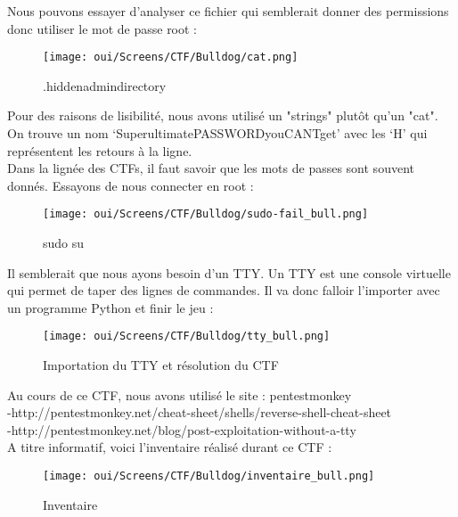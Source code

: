 Nous pouvons essayer d’analyser ce fichier qui semblerait donner des permissions donc utiliser le mot de passe root :

\begin{figure}[htp!]
  \centering
  \setlength\figureheight{7cm}
  \setlength\figurewidth{9cm}
  \texttt{[image: oui/Screens/CTF/Bulldog/cat.png]}
  \caption{.hiddenadmindirectory}
  \label{fig:courbe-tikz}
\end{figure}

Pour des raisons de lisibilité, nous avons utilisé un "strings" plutôt qu’un "cat". On trouve un nom ‘SuperultimatePASSWORDyouCANTget’ avec les ‘H’ qui représentent les retours à la ligne.\\
Dans la lignée des CTFs, il faut savoir que les mots de passes sont souvent donnés. Essayons de nous connecter en root :

\begin{figure}[htp!]
  \centering
  \setlength\figureheight{7cm}
  \setlength\figurewidth{9cm}
  \texttt{[image: oui/Screens/CTF/Bulldog/sudo-fail\_bull.png]}
  \caption{sudo su}
  \label{fig:courbe-tikz}
\end{figure}

Il semblerait que nous ayons besoin d’un TTY. Un TTY est une console virtuelle qui permet de taper des lignes de commandes. Il va donc falloir l’importer avec un programme Python et finir le jeu :

\begin{figure}[htp!]
  \centering
  \setlength\figureheight{7cm}
  \setlength\figurewidth{9cm}
  \texttt{[image: oui/Screens/CTF/Bulldog/tty\_bull.png]}
  \caption{Importation du TTY et résolution du CTF}
  \label{fig:courbe-tikz}
\end{figure}

\newpage
Au cours de ce CTF, nous avons utilisé le site : pentestmonkey\\
-http://pentestmonkey.net/cheat-sheet/shells/reverse-shell-cheat-sheet\\
-http://pentestmonkey.net/blog/post-exploitation-without-a-tty\\
A titre informatif, voici l'inventaire réalisé durant ce CTF :
 
\begin{figure}[htp!]
  \centering
  \setlength\figureheight{7cm}
  \setlength\figurewidth{9cm}
  \texttt{[image: oui/Screens/CTF/Bulldog/inventaire\_bull.png]}
  \caption{Inventaire}
  \label{fig:courbe-tikz}
\end{figure}





